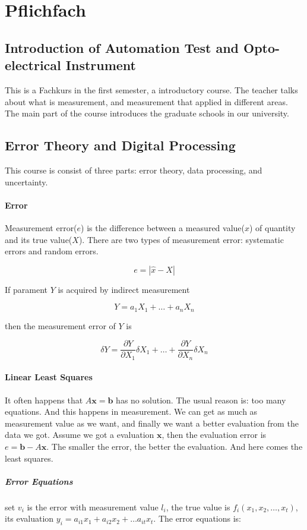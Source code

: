 \section{Pflichfach}
\subsection{Introduction of Automation Test and Opto-electrical Instrument}
This is a Fachkurs in the first semester, a introductory course. The teacher talks about what is measurement, and measurement that applied in different areas. The main part of the course introduces the graduate schools in our university.

\subsection{Error Theory and Digital Processing}
This course is consist of three parts: error theory, data processing, and uncertainty.
\paragraph{Error} Measurement error($e$) is the difference between a measured value($\hat{x}$) of quantity and its true value($X$). There are two types of measurement error: systematic errors and random errors.

$$e=|\hat{x}-X|$$

If parament $Y$ is acquired by indirect measurement

$$Y=a_1X_1+\dots+a_nX_n$$

then the measurement error of $Y$ is

$$\delta Y=\frac{\partial Y}{\partial X_1}\delta X_1 + \dots + \frac{\partial Y}{\partial X_n}\delta X_n$$

\paragraph{Linear Least Squares} It often happens that $A\mathbf{x}=\mathbf{b}$ has no solution. The usual reason is: too many equations. And this happens in measurement. We can get as much as measurement value as we want, and finally we want a better evaluation from the data we got. Assume we got a evaluation $\mathbf{x}$, then the evaluation error is $e=\mathbf{b} - A \mathbf{x}$. The smaller the error, the better the evaluation. And here comes the least squares.

\subparagraph{Error Equations}
set $v_i$ is the error with measurement value $l_i$, the true value is $f_i(x_1, x_2, \dots, x_t)$, its evaluation $y_i = a_{i1}x_1+a_{i2}x_2+\dots a_{it}x_t$. The error equations is:

